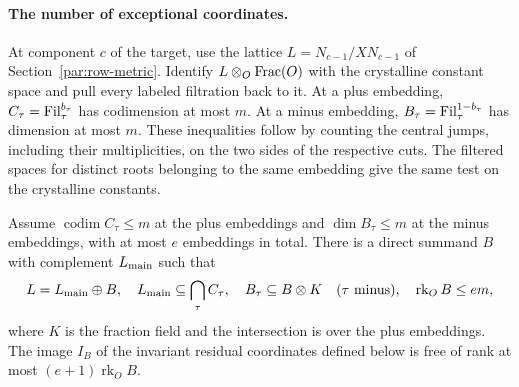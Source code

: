 \paragraph{The number of exceptional coordinates.}
\label{par:row-restricted}
At component \(c\) of the target, use the lattice
\(L=N_{c-1}/XN_{c-1}\) of Section~\ref{par:row-metric}.
Identify \(L\otimes_O{\rm Frac}(O)\)
with the crystalline constant space and pull every labeled filtration
back to it. At a plus embedding, \(C_\tau={\rm Fil}^{b_\tau}_\tau\)
has codimension at most \(m\). At a minus embedding,
\(B_\tau={\rm Fil}^{1-b_\tau}_\tau\) has dimension at most \(m\).
These inequalities follow by counting the central jumps, including
their multiplicities, on the two sides of the respective cuts.
The filtered spaces for distinct roots belonging to the same embedding
give the same test on the crystalline constants.

\begin{proposition}\label{prop:row-exceptional-coordinates}
Assume \(\operatorname{codim} C_\tau\le m\) at the plus
embeddings and \(\dim B_\tau\le m\) at the minus embeddings,
with at most \(e\) embeddings in total. There is a direct summand \(B\) with complement \(L_{\rm main}\) such that
\[
 L=L_{\rm main}\oplus B,\quad L_{\rm main}\subseteq\bigcap_\tau C_\tau,\quad B_\tau\subseteq B\otimes K\quad(\tau\text{ minus}),\quad \operatorname{rk}_O B\le em,
\]
where \(K\) is the fraction field and the intersection is over the plus embeddings.
The image \(I_B\) of the invariant residual coordinates defined
below is free of rank at most \((e+1)\operatorname{rk}_O B\).
\end{proposition}

